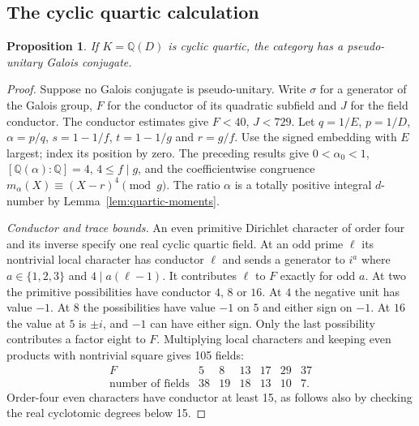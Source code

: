 \documentclass[11pt,a4paper]{article}
\newtheorem{proposition}[theorem]{Proposition}
\numberwithin{equation}{section}
\begin{document}
\subsection{The cyclic quartic calculation}\label{sec:cyclic-quartic}
\begin{proposition}\label{prop:cyclic-quartic-complete}
If $K=\mathbb Q(D)$ is cyclic quartic, the category has a pseudo-unitary
Galois conjugate.
\end{proposition}
\begin{proof}
Suppose no Galois conjugate is pseudo-unitary. Write $\sigma$ for a generator
of the Galois group,
$F$ for the conductor of its quadratic subfield and $J$ for the field
conductor. The conductor estimates give $F<40$, $J<729$. Let
$q=1/E$, $p=1/D$, $\alpha=p/q$, $s=1-1/f$, $t=1-1/g$ and $r=g/f$.
Use the signed embedding with $E$ largest; index its position by zero.
The preceding results give $0<\alpha_0<1$, $[\mathbb Q(\alpha):\mathbb Q]=4$,
$4\le f\mid g$, and the coefficientwise congruence
$m_\alpha(X)\equiv(X-r)^4\pmod g$.
The ratio $\alpha$ is a totally positive integral $d$-number by
Lemma~\ref{lem:quartic-moments}.

\medskip\noindent\emph{Conductor and trace bounds.}
An even primitive Dirichlet character of order four and its inverse
specify one real cyclic quartic field. At an odd prime $\ell$ its
nontrivial local character has conductor $\ell$ and sends a generator
to $i^a$ where $a\in\{1,2,3\}$ and $4\mid a(\ell-1)$.
It contributes $\ell$ to $F$ exactly for odd $a$. At two the primitive
possibilities have conductor $4$, $8$ or $16$. At $4$ the negative
unit has value $-1$. At $8$ the possibilities have value $-1$ on $5$
and either sign on $-1$. At $16$ the value at $5$ is $\pm i$, and $-1$
can have either sign. Only the last possibility contributes a factor
eight to $F$. Multiplying local characters and keeping even products
with nontrivial square gives 105 fields:
\[
\begin{array}{c|rrrrrr}
 F&5&8&13&17&29&37\\\hline
 \text{number of fields}&38&19&18&13&10&7 .
\end{array}
\]
Order-four even characters have conductor at least 15, as follows also
by checking the real cyclotomic degrees below 15.


\end{proof}
\end{document}
